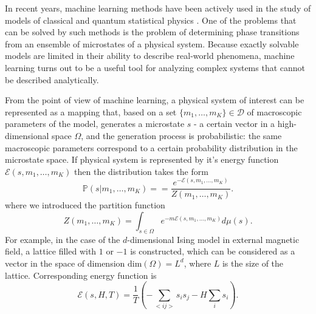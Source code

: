 \documentclass[aps,a4paper,twocolumn,showpacs]{revtex4}
\begin{document}
\par In recent years, machine learning methods have been actively used in the study of models of classical and quantum statistical physics \cite{phase_transitions_by_confusion, carrasquilla, ml_topological_phase_transitions, ml_quantum_phase_transitions, ml_hubbard_model, pca_and_vae_ising_model}. One of the problems that can be solved by such methods is the problem of determining phase transitions from an ensemble of microstates of a physical system. Because exactly solvable models are limited in their ability to describe real-world phenomena, machine learning turns out to be a useful tool for analyzing complex systems that cannot be described analytically.
\par From the point of view of machine learning, a physical system of interest can be represented as a mapping that, based on a set $\{m_1, \dots, m_K\}\in\mathcal{D}$ of macroscopic parameters of the model, generates a microstate $s$ - a certain vector in a high-dimensional space $\Omega$, and the generation process is probabilistic: the same macroscopic parameters correspond to a certain probability distribution in the microstate space. If physical system is represented by it's energy function $\mathcal{E}(s, m_1, \dots, m_K)$ then the distribution takes the form
\begin{equation}
    \mathbb{P}(s| m_1, \dots, m_K) = 
    = \frac{e^{-\mathcal{E}(s, m_1, \dots, m_K)}}{Z( m_1, \dots, m_K)}.
    \label{gibbs_distribution}
\end{equation}
where we introduced the partition function
\begin{equation}
    Z( m_1, \dots, m_K) = \int_{s \in \Omega} e^{-m\mathcal{E}(s, m_1, \dots, m_K)} d\mu(s).
    \label{partition_function}
\end{equation}
For example, in the case of the $d$-dimensional Ising model in external magnetic field, a lattice filled with $ 1 $ or $ -1 $ is constructed, which can be considered as a vector in the space of dimension $\text{dim}(\Omega)=L^{d} $, where $ L $ is the size of the lattice. Corresponding energy function is
\begin{equation}
\mathcal{E}(s, H, T) = \frac{1}{T}\left(-\sum_{<ij>}s_{i}s_{j} - H \sum_{i}s_{i}\right).
\end{equation}
\end{document}
